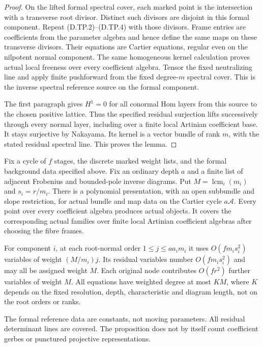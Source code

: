 \begin{proof}
On the lifted formal spectral cover, each marked
point is the intersection with a transverse root
divisor. Distinct such divisors are disjoint in this
formal component. Repeat (D.TP.2)--(D.TP.4) with those
divisors. Frame entries are coefficients from the
parameter algebra and hence define the same maps
on these transverse divisors. Their equations are
Cartier equations, regular even on the nilpotent
normal component. The same homogeneous kernel
calculation proves actual local freeness over every
coefficient algebra. Tensor the fixed neutralizing
line and apply finite pushforward from the fixed
degree-$m$ spectral cover. This is the inverse
spectral reference source on the formal component.

The first paragraph gives $H^1=0$ for all conormal
Hom layers from this source to the chosen positive
lattice. Thus the specified residual surjection
lifts successively through every normal layer,
including over a finite local Artinian coefficient
base. It stays surjective by Nakayama. Its kernel
is a vector bundle of rank $m$, with the stated
residual spectral line. This proves the lemma.
\end{proof}

\begin{proposition}
\label{D:SNC-tree-fixed-normal-presentation}
Fix a cycle of $f$ stages, the discrete marked weight lists, and
the formal background data specified above. Fix an
ordinary depth $a$ and a finite list of adjacent
Frobenius and bounded-pole inverse diagrams. Put
$M=\operatorname{lcm}_i(m_i)$ and $s_i=r/m_i$.
There is a polynomial presentation, with an open
subbundle and slope restriction, for actual bundle
and map data on the Cartier cycle $a\mathcal A$.
Every point over every coefficient algebra produces
actual objects. It covers the corresponding actual
families over finite local Artinian coefficient
algebras after choosing the fibre frames.

For component $i$, at each root-normal order
$1\leq j\leq aa_i m_i$ it uses $O(fm_i s_i^2)$
variables of weight $(M/m_i)j$. Its residual variables
number $O(fm_i s_i^2)$ and may all be assigned weight
$M$. Each original node contributes $O(fr^2)$
further variables of weight $M$. All equations have
weighted degree at most $KM$, where $K$ depends on
the fixed resolution, depth, characteristic and
diagram length, not on the root orders or ranks.

The formal reference data are constants, not moving
parameters. All residual determinant lines are covered.
The proposition does not by itself count coefficient
gerbes or punctured projective representations.
\end{proposition}

